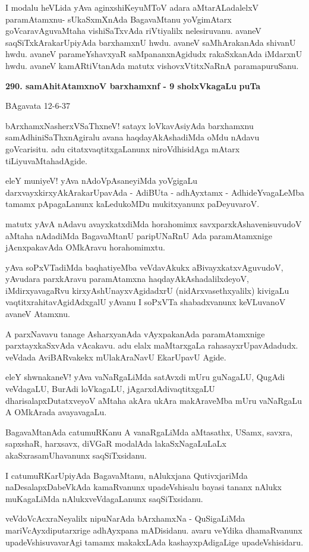 I modalu heVLida yAva aginxshiKeyuMToV adara aMtarALadalelxV paramAtamxnu- sUkaSxmX\-nAda BagavaMtanu yoVgimAtarx goVcaravAguvaMtaha vishiSaTxvAda riVtiyalilx nelesiruvanu. avaneV saqSiTxkAraka\-rUpiyAda barxhamxnU hwdu. avaneV saMhArakanAda shivanU hwdu. avaneV parameYshavxyaR saMpananx\-nAgidudx rakaSxka\-nAda iMdarxnU hwdu. avaneV kamARtiVtanAda matutx vishovxVtitxNaRnA parama\-puruSanu.

\medskip
\noindent
\textbf{290. samAhitAtamxnoV barxhamxnf - 9 sholxVkagaLu} \hfill{\bf puTa \pageref{144}}

\hfill{BAgavata 12-6-37}

\smallskip
bArxhamxNasherxVSaThxneV! satayx loVkavAsiyAda barxhamxnu samAdhiniSaThxnAgiralu avana haqdayAkAsha\-diMda oMdu nAdavu goVcarisitu. adu citatxvaqtitxgaLanunx niroVdhisidAga mAtarx tiLiyuvaMtahadAgide.

eleY muniyeV! yAva nAdoVpAsaneyiMda yoVgigaLu darxvayxkirxyAkAraka\-rUpavAda - Adi\-BUta - adhAyxtamx - AdhideYvagaLeMba tamamx pApagaLanunx kaLedukoMDu mukitxyanunx paDeyuvaroV.

matutx yAvA nAdavu avayxkatxdiMda horahomimx savxparxkAshavenisuvudoV aMtaha nAdadiMda Baga\-vaMtanU paripUNaRnU Ada paramAtamxnige jAcnxpakavAda OMkAravu horahomimxtu.

yAva soPxVTadiMda baqhatiyeMba veVdavAkukx aBivayxkatxvAguvudoV, yAvudara parxkAravu para\-mAtamxna haqdayAkAshadalilxdeyoV, iMdirxyavagaRvu kirxyA\break\-shUnayxvAgidadxrU (nidArxvasethxyalilx) kivi\-gaLu vaqtitxrahitavAgidAdxgalU yAvanu I soPxVTa shabadxvanunx keVLuvanoV avaneV Atamxnu.

A parxNavavu tanage AsharxyanAda vAyxpakanAda paramAtamxnige parxtayxkaSxvAda vAcakavu. adu elalx maMtarx\-gaLa rahasayxrUpavAdadudx. veVdada AviBARvakekx mUlakAraNavU EkarUpavU Agide.

eleY shwnakaneV! yAva vaNaRgaLiMda satAvxdi mUru guNagaLU, QugAdi veVdagaLU, BurAdi loVkagaLU, jAgarxdAdivaqtitxgaLU dharisalapxDutatxveyoV aMtaha akAra ukAra makAraveMba mUru vaNaRgaLu A OMkArada avayavagaLu.

BagavaMtanAda catumuRKanu A vanaRgaLiMda aMtasathx, USamx, savxra, sapxshaR, harxsavx, diVGaR moda\-lAda lakaSxNagaLuLaLx akaSxrasamUhavanunx saqSiTxsidanu.

I catumuRKarUpiyAda BagavaMtanu, nAlukxjana QutivxjariMda naDesalapxDa\-beVkAda kamaR\-vanunx upadeVshisalu bayasi tananx nAlukx muKagaLiMda nAlukxveVda\-gaLanunx saqSiTxsidanu.

veVdoVcAcxraNeyalilx nipuNarAda bArxhamxNa - QuSigaLiMda mariVcAyxdiputarxrige adhAyxpana mADisi\-danu. avaru veYdika dhamaRvanunx upadeVshisuvavarAgi tamamx makakxLAda kashayxpAdigaLige upadeVshisidaru.


